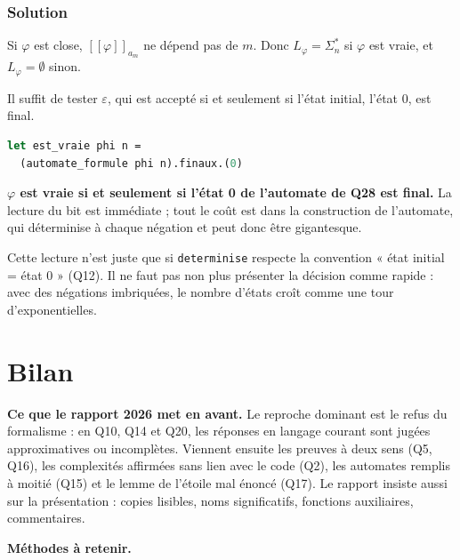 \documentclass[11pt,a4paper]{article}
\begin{document}
\hypertarget{solution-29}{%
\subsubsection{Solution}\label{solution-29}}

Si \(\varphi\) est close, \([\![\varphi]\!]_{a_m}\) ne dépend pas de \(m\). Donc \(L_\varphi=\Sigma_n^*\) si \(\varphi\) est vraie, et \(L_\varphi=\emptyset\) sinon.

Il suffit de tester \(\varepsilon\), qui est accepté si et seulement si l'état initial, l'état \(0\), est final.

\begin{lstlisting}[language=Caml]
let est_vraie phi n =
  (automate_formule phi n).finaux.(0)
\end{lstlisting}

\textbf{\(\varphi\) est vraie si et seulement si l'état 0 de l'automate de Q28 est final.} La lecture du bit est immédiate ; tout le coût est dans la construction de l'automate, qui déterminise à chaque négation et peut donc être gigantesque.

\begin{piege}

Cette lecture n'est juste que si \texttt{determinise} respecte la convention « état initial = état 0 » (Q12). Il ne faut pas non plus présenter la décision comme rapide : avec des négations imbriquées, le nombre d'états croît comme une tour d'exponentielles.

\end{piege}

\hypertarget{bilan}{%
\section{Bilan}\label{bilan}}

\textbf{Ce que le rapport 2026 met en avant.} Le reproche dominant est le refus du formalisme : en Q10, Q14 et Q20, les réponses en langage courant sont jugées approximatives ou incomplètes. Viennent ensuite les preuves à deux sens (Q5, Q16), les complexités affirmées sans lien avec le code (Q2), les automates remplis à moitié (Q15) et le lemme de l'étoile mal énoncé (Q17). Le rapport insiste aussi sur la présentation : copies lisibles, noms significatifs, fonctions auxiliaires, commentaires.

\textbf{Méthodes à retenir.}
\end{document}
